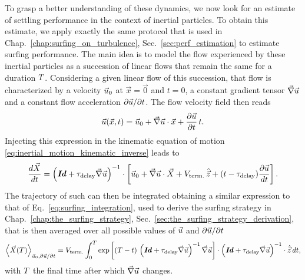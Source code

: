 To grasp a better understanding of these dynamics, we now look for an estimate of settling performance in the context of inertial particles.
To obtain this estimate, we apply exactly the same protocol that is used in Chap.~\ref{chap:surfing_on_turbulence}, Sec.~\ref{sec:perf_estimation} to estimate surfing performance.
The main idea is to model the flow experienced by these inertial particles as a succession of linear flows that remain the same for a duration $T$.
Considering a given linear flow of this succession, that flow is characterized by a velocity $\vec{u}_0$ at $\vec{x} = \vec{0}$ and $t = 0$, a constant gradient tensor $\vec{\nabla} \vec{u}$ and a constant flow acceleration $\partial \vec{u} / \partial t$.
The flow velocity field then reads 
\begin{equation}
	\vec{u}(\vec{x}, t) = \vec{u}_0 + \vec{\nabla} \vec{u} \cdot \vec{x} + \frac{\partial \vec{u}}{\partial t} \, t.
\end{equation}
Injecting this expression in the kinematic equation of motion \eqref{eq:inertial_motion_kinematic_inverse} leads to
\begin{equation}
	 \frac{d \vec{X}}{dt} = \left( \boldsymbol{\mathit{Id}} + \tau_{\mathrm{delay}} \vec{\nabla} \vec{u} \right)^{-1} \cdot \left[ \vec{u}_0 + \vec{\nabla} \vec{u} \cdot \vec{X} + V_{\mathrm{term.}} \, \hat{\vec{z}} + (t - \tau_{\mathrm{delay}}) \frac{\partial \vec{u}}{dt} \right].
\end{equation}
The trajectory of such can then be integrated obtaining a similar expression to that of Eq.~\eqref{eq:surfing_integration}, used to derive the surfing strategy in Chap.~\ref{chap:the_surfing_strategy}, Sec.~\ref{sec:the_surfing_strategy_derivation}, that is then averaged over all possible values of $\vec{u}$ and $\partial \vec{u} / \partial t$
\begin{equation}
	\label{eq:displacement}
	\left\langle \vec{X}(T) \right\rangle_{\vec{u}_0, \partial \vec{u} / \partial t} = V_{\mathrm{term.}} \int_{0}^{T} \exp \left[ (T - t) \, \left( \boldsymbol{\mathit{Id}} + \tau_{\mathrm{delay}} \vec{\nabla} \vec{u} \right)^{-1} \vec{\nabla} \vec{u} \right] \cdot \left( \boldsymbol{\mathit{Id}} + \tau_{\mathrm{delay}} \vec{\nabla} \vec{u} \right)^{-1} \cdot \hat{\vec{z}} \, dt,
\end{equation}
with $T$ the final time after which $\vec{\nabla} \vec{u}$ changes.


